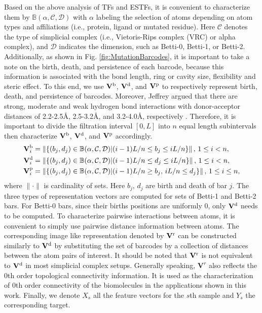 \documentclass[10pt]{article}
\begin{document}
Based on the above analysis of TFs and ESTFs, it is convenient to characterize them by $\mathbb{B}(\alpha,{\mathcal C},{\mathcal D})$ %
with $\alpha$ labeling the selection of atoms depending on atom types and affiliations (i.e., protein, ligand or mutated residue). Here ${\mathcal C}$ denotes the type of simplicial complex (i.e.,  Vietoris-Rips complex (VRC)  or alpha complex), and ${\mathcal D}$ indicates the dimension, such as Betti-0, Betti-1, or Betti-2.  Additionally, as shown in 	Fig.   \ref{fig:MutationBarcodes}, it is important to take a note on the birth, death, and persistence of each barcode, because this information is associated with the bond length, ring or cavity size, flexibility and steric effect. To this end, we use $\mathbf{V}^{\rm{b}}$, $\mathbf{V}^{\rm{d}}$, and $\mathbf{V}^{\rm{p}}$ to respectively represent birth, death, and persistence of barcodes. Moreover, Jeffrey argued that there are strong, moderate and weak hydrogen bond interactions with   donor-acceptor distances of 2.2-2.5\AA, 2.5-3.2\AA, and 3.2-4.0\AA, respectively  \cite{Jeffrey:1997}. Therefore, it is important to divide the filtration interval $[0,L]$   into $n$ equal length subintervals then characterize $\mathbf{V}^{\rm{b}}$, $\mathbf{V}^{\rm{d}}$, and $\mathbf{V}^{\rm{p}}$ accordingly.
\begin{equation}\label{eq:DigitalRepresentation}
\begin{aligned}
\mathbf{V}^{\rm{b}}_i &= \left\|\{(b_j,d_j)\in\mathbb{B}(\alpha,{\mathcal C},{\mathcal D})|(i-1)L/n\leq b_j\leq iL/n\}\right\|, \, 1\leq i < n, \\
\mathbf{V}^{\rm{d}}_i &= \left\|\{(b_j,d_j)\in\mathbb{B}(\alpha,{\mathcal C},{\mathcal D})|(i-1)L/n\leq d_j\leq iL/n\}\right\|, \, 1\leq i < n, \\
\mathbf{V}^{\rm{p}}_i &= \left\|\{(b_j,d_j)\in\mathbb{B}(\alpha,{\mathcal C},{\mathcal D})|(i-1)L/n\geq b_j,\,iL/n \leq d_j\}\right\|, \, 1\leq i \leq n,
\end{aligned}
\end{equation}
where $\|\cdot\|$ is cardinality of sets. Here $b_j,\, d_j$ are birth and death of bar $j$. The three types of representation vectors are computed for sets of Betti-1 and Betti-2 bars. For Betti-0 bars, since their births positions are uniformly $0$, only $\mathbf{V}^{\rm{d}}$ needs to be computed.  %
To characterize pairwise interactions between atoms, it is convenient to simply use pairwise distance information between atoms. The corresponding image like representation denoted by $\mathbf{V}^{\rm{r}}$ can be constructed similarly to $\mathbf{V}^{\rm{d}}$ by substituting the set of barcodes by a collection of distances between the atom pairs of interest. It should be noted that $\mathbf{V}^{\rm{r}}$ is not equivalent to $\mathbf{V}^{\rm{d}}$ in most simplicial complex setups. Generally speaking, $\mathbf{V}^r$ also reflects the $0$th order topological connectivity information. It is used as the characterization of $0$th order connectivity of the biomolecules in the applications shown in this work. 
Finally, we denote $X_s$ all the feature vectors for the $s$th sample and $Y_s$ the corresponding target. 
\end{document}
